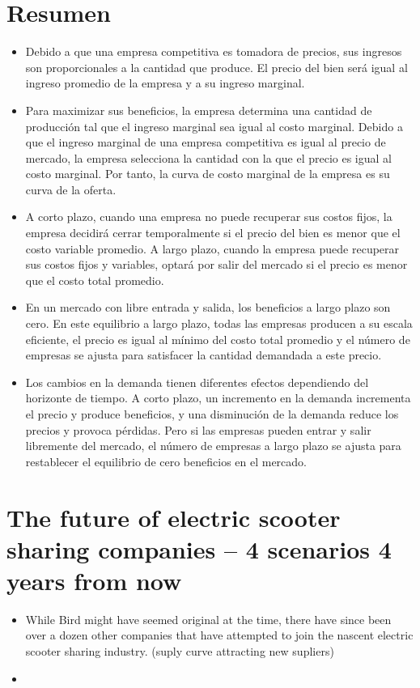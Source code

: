 \documentclass{article}
\begin{document}
\section{Resumen}
\begin{itemize}
    \item Debido a que una empresa competitiva es tomadora de precios, sus ingresos son proporcionales a la cantidad que produce. El precio del bien será igual al ingreso promedio de la empresa y a su ingreso marginal. 
    \item  Para maximizar sus beneficios, la empresa determina una cantidad de producción tal que el ingreso marginal sea igual al costo marginal. Debido a que el ingreso marginal de una empresa competitiva es igual al precio de mercado, la empresa selecciona la cantidad con la que el precio es igual al costo marginal. Por tanto, la curva de costo marginal de la empresa es su curva de la oferta. 
    \item  A corto plazo, cuando una empresa no puede recuperar sus costos fijos, la empresa decidirá cerrar temporalmente si el precio del bien es menor que el costo variable promedio. A largo plazo, cuando la empresa puede recuperar sus 
    costos fijos y variables, optará por salir del mercado si el precio es menor que el costo total promedio. 
    \item  En un mercado con libre entrada y salida, los beneficios a largo plazo son cero. En este equilibrio a largo plazo, todas las empresas producen a su escala eficiente, el precio es igual al mínimo del costo total promedio y el número de empresas se ajusta para satisfacer la cantidad demandada a este precio. 
    \item  Los cambios en la demanda tienen diferentes efectos dependiendo del horizonte de tiempo. A corto plazo, un incremento en la demanda incrementa el precio y produce beneficios, y una disminución de la demanda reduce los precios y provoca pérdidas. Pero si las empresas pueden entrar y salir libremente del mercado, el número de empresas a largo plazo se ajusta para restablecer el equilibrio de cero beneficios en el mercado.
\end{itemize}


\section{The future of electric scooter sharing companies – 4 scenarios 4 years from now}
\begin{itemize}
    \item While Bird might have seemed original at the time, there have since been over a dozen other companies that have attempted to join the nascent electric scooter sharing industry. (suply curve attracting new supliers)
    \item 
\end{itemize}


\end{document}
